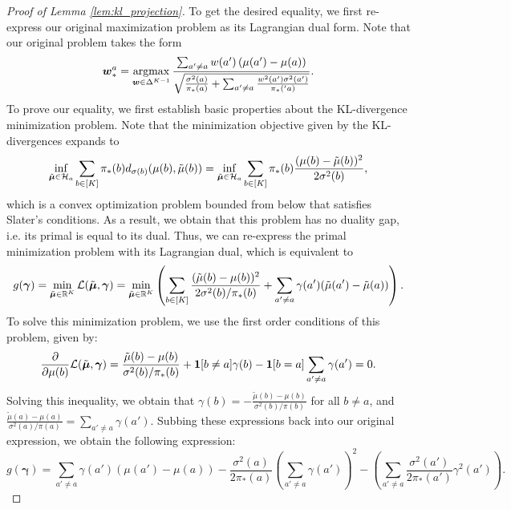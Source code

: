 \documentclass{article}
\begin{document}
\begin{appendices}
\begin{proof}[Proof of Lemma \ref{lem:kl_projection}]
    To get the desired equality, we first re-express our original maximization problem as its Lagrangian dual form. Note that our original problem takes the form
    \begin{equation}
        \bm{w}_*^a = \argmax_{\bm{w} \in \Delta^{K-1}} \frac{\sum_{a'\neq a} w(a')\left(\mu(a') - \mu(a) \right)}{\sqrt{\frac{\sigma^2(a)}{\pi_*(a)}+\sum_{a' \neq a}\frac{w^2(a')\sigma^2(a')}{\pi_*('a)} }}.
    \end{equation}
    To prove our equality, we first establish basic properties about the KL-divergence minimization problem. Note that the minimization objective given by the KL-divergences expands to
    $$
            \inf_{\tilde{\boldsymbol{\mu}} \in \mathcal{H}_a} \sum_{b \in [K]} \pi_*(b) d_{\sigma(b)}(\mu(b), \tilde\mu(b)) = \inf_{\tilde{\boldsymbol{\mu}} \in \mathcal{H}_a}\sum_{b \in [K]} \pi_*(b)\frac{(\mu(b) - \tilde{\mu}(b))^2}{2\sigma^2(b)}, 
    $$
    which is a convex optimization problem bounded from below that satisfies Slater's conditions. As a result, we obtain that this problem has no duality gap, i.e. its primal is equal to its dual. Thus, we can re-express the primal minimization problem with its Lagrangian dual, which is equivalent to
    $$
    g(\boldsymbol{\gamma}) = \min_{\tilde{\boldsymbol{\mu}} \in \mathbb{R}^K}\mathcal{L}(\tilde{\boldsymbol\mu}, \boldsymbol{\gamma}) = \min_{\tilde{\boldsymbol{\mu}} \in \mathbb{R}^K} \left(\sum_{b \in [K]}\frac{(\tilde\mu(b) - \mu(b))^2}{2\sigma^2(b)/\pi_*(b)} + \sum_{a' \neq a}\gamma(a')(\tilde\mu(a')- \tilde\mu(a))\right).
    $$
    To solve this minimization problem, we use the first order conditions of this problem, given by:
    $$
        \frac{\partial}{\partial\mu(b)} \mathcal{L}(\tilde{\boldsymbol{\mu}}, \boldsymbol\gamma) = \frac{\tilde\mu(b) - \mu(b)}{\sigma^2(b)/\pi_*(b)} + \mathbf{1}[b\neq a]\gamma(b) - \mathbf{1}[b=a]\sum_{a' \neq a} \gamma(a') = 0. 
    $$
    Solving this inequality, we obtain that $\gamma(b) = -\frac{\tilde\mu(b) - \mu(b)}{\sigma^2(b)/\pi(b)}$ for all $b \neq a$, and $\frac{\tilde\mu(a) - \mu(a)}{\sigma^2(a) / \pi(a)} = \sum_{a' \neq a} \gamma(a')$. Subbing these expressions back into our original expression, we obtain the following expression:
    $$
    g(\bm{\gamma}) = \sum_{a' \neq a} \gamma(a')\left(\mu(a') - \mu(a)\right) -\frac{\sigma^2(a)}{2\pi_*(a)}\left( \sum_{a' \neq a} \gamma(a') \right)^2 - \left(\sum_{a' \neq a} \frac{\sigma^2(a')}{2\pi_*(a')} \gamma^2(a') \right).
    $$


\end{proof}
\end{appendices}
\end{document}
